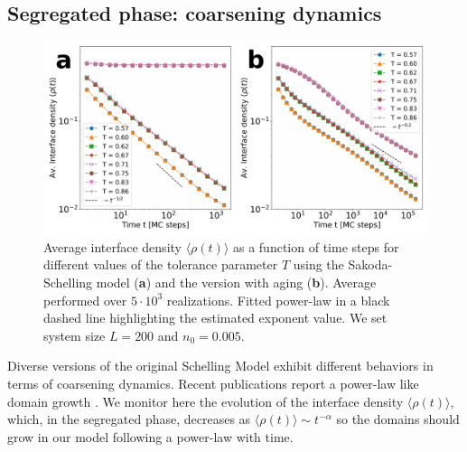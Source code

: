 \subsection{Segregated phase: coarsening dynamics}

\begin{figure}
\centering \captionsetup{font=sf}
\includegraphics[width=\linewidth]{Figs/Aging_Schelling/fig4.pdf} 
\caption[Average interface density evolution]{Average interface density $\langle \rho (t) \rangle$ as a function of time steps for different values of the tolerance parameter $T$ using the Sakoda-Schelling model (\textbf{a}) and the version with aging (\textbf{b}). Average performed over $5 \cdot 10^3$ realizations. Fitted power-law in a black dashed line highlighting the estimated exponent value. We set system size $L = 200$ and $n_0 = 0.005$.}
\label{Fig3}
\end{figure}

Diverse versions of the original Schelling Model exhibit different behaviors in terms of coarsening dynamics. Recent publications report a power-law like domain growth \cite{Dall_Asta_2008,Interfacial_roughening}. We monitor here the evolution of the interface density $\langle \rho (t) \rangle$, which, in the segregated phase, decreases as $ \langle \rho (t) \rangle \sim t^{-\alpha}$ so the domains should grow in our model following a power-law with time. 

